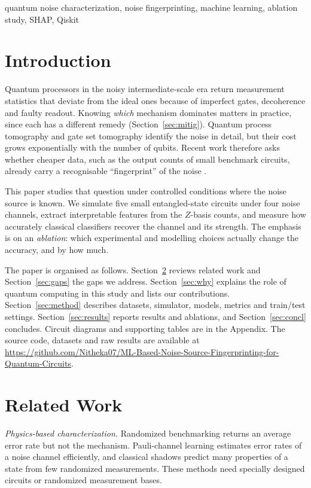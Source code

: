 \documentclass[conference]{IEEEtran}
\begin{document}
\begin{IEEEkeywords}
quantum noise characterization, noise fingerprinting, machine learning, ablation study, SHAP, Qiskit
\end{IEEEkeywords}

\section{Introduction}
Quantum processors in the noisy intermediate-scale era \cite{preskill,bharti} return measurement statistics that deviate from the ideal ones because of imperfect gates, decoherence and faulty readout. Knowing \emph{which} mechanism dominates matters in practice, since each has a different remedy (Section~\ref{sec:mitig}). Quantum process tomography \cite{chuang} and gate set tomography \cite{blume} identify the noise in detail, but their cost grows exponentially with the number of qubits. Recent work therefore asks whether cheaper data, such as the output counts of small benchmark circuits, already carry a recognisable ``fingerprint'' of the noise \cite{martina,jain}.

This paper studies that question under controlled conditions where the noise source is known. We simulate five small entangled-state circuits under four noise channels, extract interpretable features from the $Z$-basis counts, and measure how accurately classical classifiers recover the channel and its strength. The emphasis is on an \emph{ablation}: which experimental and modelling choices actually change the accuracy, and by how much.

The paper is organised as follows. Section~\ref{sec:related} reviews related work and Section~\ref{sec:gaps} the gaps we address. Section~\ref{sec:why} explains the role of quantum computing in this study and lists our contributions. Section~\ref{sec:method} describes datasets, simulator, models, metrics and train/test settings. Section~\ref{sec:results} reports results and ablations, and Section~\ref{sec:concl} concludes. Circuit diagrams and supporting tables are in the Appendix. The source code, datasets and raw results are available at \url{https://github.com/Nitheka07/ML-Based-Noise-Source-Fingerprinting-for-Quantum-Circuits}.

\section{Related Work}\label{sec:related}
\emph{Physics-based characterization.} Randomized benchmarking \cite{magesan} returns an average error rate but not the mechanism. Pauli-channel learning \cite{harper} estimates error rates of a noise channel efficiently, and classical shadows \cite{huang} predict many properties of a state from few randomized measurements. These methods need specially designed circuits or randomized measurement bases.
\end{document}
